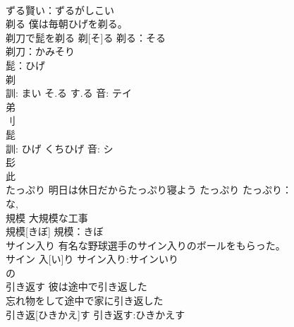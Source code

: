\documentclass[8pt]{extreport}
\begin{document}
\begin{CJK}{UTF8}{min}
\\	ずる賢い：ずるがしこい
\\	剃る	僕は毎朝ひげを剃る。 
\\	剃刀で髭を剃る	剃[そ]る			剃る：そる
\\	剃刀：かみそり
\\	髭：ひげ
\\	剃 
\\	訓: まい そ.る す.る 音: テイ 
\\	弟 
\\	刂 
\\	髭 
\\	訓: ひげ くちひげ 音: シ 
\\	髟 
\\	此 
\\	たっぷり	明日は休日だからたっぷり寝よう	たっぷり			たっぷり：
\\	な, 
\\	規模	大規模な工事 
\\	規模[きぼ]			規模：きぼ
\\	サイン入り	有名な野球選手のサイン入りのボールをもらった。 
\\	サイン 入[い]り			サイン入り:サインいり
\\	の 
\\	引き返す	彼は途中で引き返した 
\\	忘れ物をして途中で家に引き返した 
\\	引き返[ひきかえ]す			引き返す:ひきかえす
\end{CJK}
\end{document}
